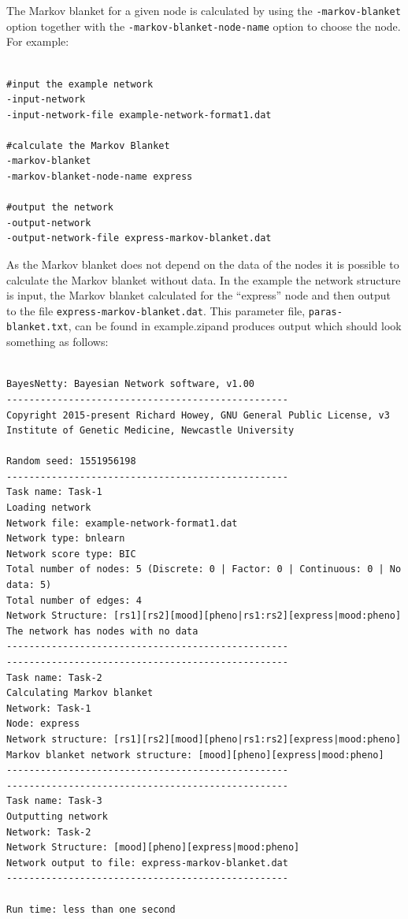 \documentclass[a4paper,12pt]{article}
\newcommand{\code}[1]{{\footnotesize{{\tt #1}}}}
\begin{document}
The Markov blanket for a given node is calculated by using the \code{-markov-blanket} option together with the \code{-markov-blanket-node-name} option to choose the node. For example: 
\vspace{0.35cm} \begin{lstlisting}

#input the example network
-input-network
-input-network-file example-network-format1.dat

#calculate the Markov Blanket
-markov-blanket
-markov-blanket-node-name express

#output the network
-output-network
-output-network-file express-markov-blanket.dat

\end{lstlisting} \vspace{0.35cm}
As the Markov blanket does not depend on the data of the nodes it is possible to calculate the Markov blanket without data. In the example the network structure is input, the Markov blanket calculated for the ``express'' node and then output to the file \code{express-markov-blanket.dat}. This parameter file, \code{paras-blanket.txt}, can be found in example.zipand produces output which should look something as follows: 
\vspace{0.35cm} \begin{lstlisting}

BayesNetty: Bayesian Network software, v1.00
--------------------------------------------------
Copyright 2015-present Richard Howey, GNU General Public License, v3
Institute of Genetic Medicine, Newcastle University

Random seed: 1551956198
--------------------------------------------------
Task name: Task-1
Loading network
Network file: example-network-format1.dat
Network type: bnlearn
Network score type: BIC
Total number of nodes: 5 (Discrete: 0 | Factor: 0 | Continuous: 0 | No data: 5)
Total number of edges: 4
Network Structure: [rs1][rs2][mood][pheno|rs1:rs2][express|mood:pheno]
The network has nodes with no data
--------------------------------------------------
--------------------------------------------------
Task name: Task-2
Calculating Markov blanket
Network: Task-1
Node: express
Network structure: [rs1][rs2][mood][pheno|rs1:rs2][express|mood:pheno]
Markov blanket network structure: [mood][pheno][express|mood:pheno]
--------------------------------------------------
--------------------------------------------------
Task name: Task-3
Outputting network
Network: Task-2
Network Structure: [mood][pheno][express|mood:pheno]
Network output to file: express-markov-blanket.dat
--------------------------------------------------

Run time: less than one second

\end{lstlisting} \vspace{0.35cm}
\end{document}
